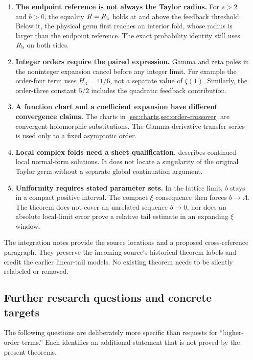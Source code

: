 \begin{enumerate}
\item \textbf{The endpoint reference is not always the Taylor radius.}
For $s>2$ and $b>0$, the equality $R=R_{\mathrm b}$ holds at and above the feedback threshold.
Below it, the physical germ first reaches an interior fold, whose
radius is larger than the endpoint reference.  The exact probability
identity still uses $R_{\mathrm b}$ on both sides.

\item \textbf{Integer orders require the paired expression.}
Gamma and zeta poles in the noninteger expansion cancel before any
integer limit.  For example the order-four term uses $H_3=11/6$,
not a separate value of $\zeta(1)$.  Similarly, the order-three
constant $5/2$ includes the quadratic feedback contribution.

\item \textbf{A function chart and a coefficient expansion have
different convergence claims.}
The charts in \cref{sec:charts,sec:order-crossover} are convergent
holomorphic substitutions.  The Gamma-derivative transfer series is
used only to a fixed asymptotic order.

\item \textbf{Local complex folds need a sheet qualification.}
 describes continued local normal-form
solutions.  It does not locate a singularity of the original Taylor
germ without a separate global continuation argument.

\item \textbf{Uniformity requires stated parameter sets.}
In the lattice limit, $b$ stays in a compact positive interval.
The compact $\xi$ consequence then forces $b\to A$.  The theorem
does not cover an unrelated sequence $b\to0$, nor does an absolute
local-limit error prove a relative tail estimate in an expanding
$\xi$ window.
\end{enumerate}

The integration notes provide the source locations and a proposed
cross-reference paragraph.  They preserve the incoming source's
historical theorem labels and credit the earlier linear-tail models.
No existing theorem needs to be silently relabeled or removed.

\subsection{Further research questions and concrete targets}

The following questions are deliberately more specific than requests
for ``higher-order terms.''  Each identifies an additional statement
that is not proved by the present theorems.

